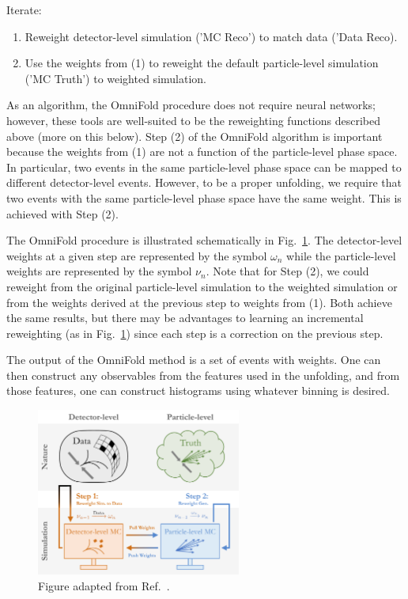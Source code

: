 \documentclass[NOTE, atlasdraft=true, texlive=2016, UKenglish]{\ATLASLATEXPATH atlasdoc}
\begin{document}
\begin{description}
\item Iterate:
	\begin{enumerate}[label={(\arabic*)}]
		\item Reweight detector-level simulation ('MC Reco') to match data ('Data Reco).
		\item Use the weights from (1) to reweight the default particle-level simulation ('MC Truth') to weighted simulation.
	\end{enumerate}
\end{description}

As an algorithm, the OmniFold procedure does not require neural networks; however, these tools are well-suited to be the reweighting functions described above (more on this below).  Step (2) of the OmniFold algorithm is important because the weights from (1) are not a function of the particle-level phase space.  In particular, two events in the same particle-level phase space can be mapped to different detector-level events.  However, to be a proper unfolding, we require that two events with the same particle-level phase space have the same weight.  This is achieved with Step (2).

The OmniFold procedure is illustrated schematically in Fig.~\ref{fig:omnifoldschematic}.  The detector-level weights at a given step are represented by the symbol $\omega_n$ while the particle-level weights are represented by the symbol $\nu_n$.  Note that for Step (2), we could reweight from the original particle-level simulation to the weighted simulation or from the weights derived at the previous step to weights from (1).  Both achieve the same results, but there may be advantages to learning an incremental reweighting (as in Fig.~\ref{fig:omnifoldschematic}) since each step is a correction on the previous step.

The output of the OmniFold method is a set of events with weights.  One can then construct any observables from the features used in the unfolding, and from those features, one can construct histograms using whatever binning is desired.

\begin{figure}[h!]
\centering
\includegraphics[width=0.6\textwidth]{Figures/schematic.pdf}
\caption{Figure adapted from Ref.~\cite{1911.09107}.}
\label{fig:omnifoldschematic}
\end{figure}
\end{document}
